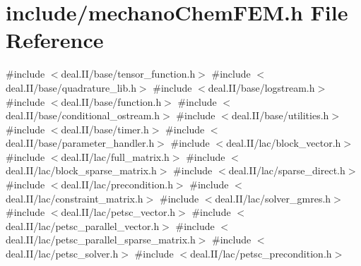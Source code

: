 \section{include/mechano\+Chem\+F\+EM.h File Reference}
\label{mechano_chem_f_e_m_8h}
{\ttfamily \#include $<$deal.\+I\+I/base/tensor\+\_\+function.\+h$>$}\newline
{\ttfamily \#include $<$deal.\+I\+I/base/quadrature\+\_\+lib.\+h$>$}\newline
{\ttfamily \#include $<$deal.\+I\+I/base/logstream.\+h$>$}\newline
{\ttfamily \#include $<$deal.\+I\+I/base/function.\+h$>$}\newline
{\ttfamily \#include $<$deal.\+I\+I/base/conditional\+\_\+ostream.\+h$>$}\newline
{\ttfamily \#include $<$deal.\+I\+I/base/utilities.\+h$>$}\newline
{\ttfamily \#include $<$deal.\+I\+I/base/timer.\+h$>$}\newline
{\ttfamily \#include $<$deal.\+I\+I/base/parameter\+\_\+handler.\+h$>$}\newline
{\ttfamily \#include $<$deal.\+I\+I/lac/block\+\_\+vector.\+h$>$}\newline
{\ttfamily \#include $<$deal.\+I\+I/lac/full\+\_\+matrix.\+h$>$}\newline
{\ttfamily \#include $<$deal.\+I\+I/lac/block\+\_\+sparse\+\_\+matrix.\+h$>$}\newline
{\ttfamily \#include $<$deal.\+I\+I/lac/sparse\+\_\+direct.\+h$>$}\newline
{\ttfamily \#include $<$deal.\+I\+I/lac/precondition.\+h$>$}\newline
{\ttfamily \#include $<$deal.\+I\+I/lac/constraint\+\_\+matrix.\+h$>$}\newline
{\ttfamily \#include $<$deal.\+I\+I/lac/solver\+\_\+gmres.\+h$>$}\newline
{\ttfamily \#include $<$deal.\+I\+I/lac/petsc\+\_\+vector.\+h$>$}\newline
{\ttfamily \#include $<$deal.\+I\+I/lac/petsc\+\_\+parallel\+\_\+vector.\+h$>$}\newline
{\ttfamily \#include $<$deal.\+I\+I/lac/petsc\+\_\+parallel\+\_\+sparse\+\_\+matrix.\+h$>$}\newline
{\ttfamily \#include $<$deal.\+I\+I/lac/petsc\+\_\+solver.\+h$>$}\newline
{\ttfamily \#include $<$deal.\+I\+I/lac/petsc\+\_\+precondition.\+h$>$}\newline
